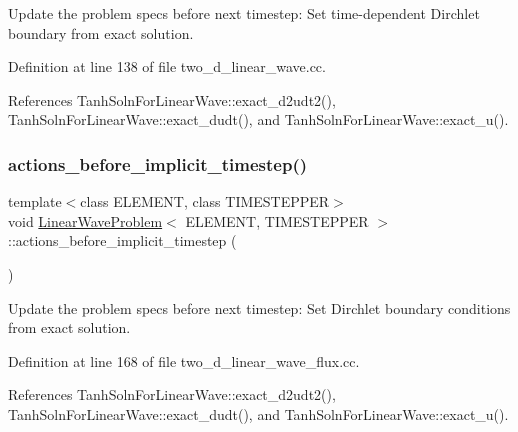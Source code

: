 Update the problem specs before next timestep\+: Set time-\/dependent Dirchlet boundary from exact solution. 



Definition at line 138 of file two\+\_\+d\+\_\+linear\+\_\+wave.\+cc.



References Tanh\+Soln\+For\+Linear\+Wave\+::exact\+\_\+d2udt2(), Tanh\+Soln\+For\+Linear\+Wave\+::exact\+\_\+dudt(), and Tanh\+Soln\+For\+Linear\+Wave\+::exact\+\_\+u().

\mbox{\label{classLinearWaveProblem_a39cfcb8ce06463ace1ac09fa43afa00a}} 
\subsubsection{\texorpdfstring{actions\+\_\+before\+\_\+implicit\+\_\+timestep()}{actions\_before\_implicit\_timestep()}\hspace{0.1cm}{\footnotesize\ttfamily [2/2]}}
{\footnotesize\ttfamily template$<$class E\+L\+E\+M\+E\+NT, class T\+I\+M\+E\+S\+T\+E\+P\+P\+ER$>$ \\
void \hyperlink{classLinearWaveProblem}{Linear\+Wave\+Problem}$<$ E\+L\+E\+M\+E\+NT, T\+I\+M\+E\+S\+T\+E\+P\+P\+ER $>$\+::actions\+\_\+before\+\_\+implicit\+\_\+timestep (\begin{DoxyParamCaption}{ }\end{DoxyParamCaption})\hspace{0.3cm}{\ttfamily [inline]}}



Update the problem specs before next timestep\+: Set Dirchlet boundary conditions from exact solution. 



Definition at line 168 of file two\+\_\+d\+\_\+linear\+\_\+wave\+\_\+flux.\+cc.



References Tanh\+Soln\+For\+Linear\+Wave\+::exact\+\_\+d2udt2(), Tanh\+Soln\+For\+Linear\+Wave\+::exact\+\_\+dudt(), and Tanh\+Soln\+For\+Linear\+Wave\+::exact\+\_\+u().

\mbox{\label{classLinearWaveProblem_a66e87510f6fa8af693cede514cb7a62e}} 
